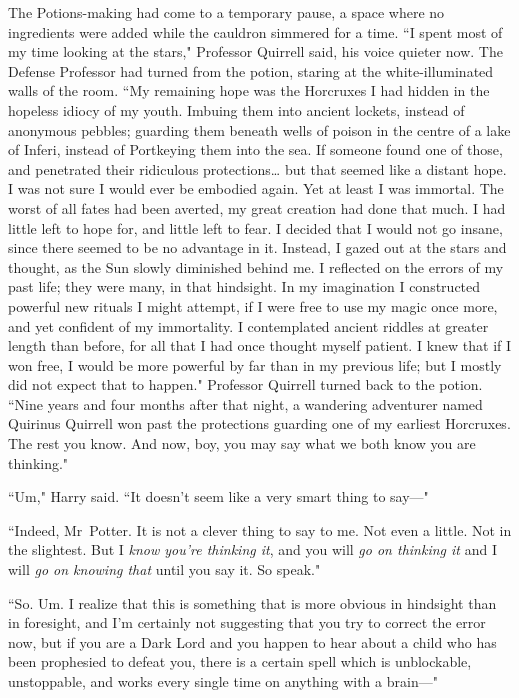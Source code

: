 The Potions-making had come to a temporary pause, a space where no ingredients were added while the cauldron simmered for a time. ``I spent most of my time looking at the stars," Professor Quirrell said, his voice quieter now. The Defense Professor had turned from the potion, staring at the white-illuminated walls of the room. ``My remaining hope was the Horcruxes I had hidden in the hopeless idiocy of my youth. Imbuing them into ancient lockets, instead of anonymous pebbles; guarding them beneath wells of poison in the centre of a lake of Inferi, instead of Portkeying them into the sea. If someone found one of those, and penetrated their ridiculous protections{\ldots} but that seemed like a distant hope. I was not sure I would ever be embodied again. Yet at least I was immortal. The worst of all fates had been averted, my great creation had done that much. I had little left to hope for, and little left to fear. I decided that I would not go insane, since there seemed to be no advantage in it. Instead, I gazed out at the stars and thought, as the Sun slowly diminished behind me. I reflected on the errors of my past life; they were many, in that hindsight. In my imagination I constructed powerful new rituals I might attempt, if I were free to use my magic once more, and yet confident of my immortality. I contemplated ancient riddles at greater length than before, for all that I had once thought myself patient. I knew that if I won free, I would be more powerful by far than in my previous life; but I mostly did not expect that to happen." Professor Quirrell turned back to the potion. ``Nine years and four months after that night, a wandering adventurer named Quirinus Quirrell won past the protections guarding one of my earliest Horcruxes. The rest you know. And now, boy, you may say what we both know you are thinking."

``Um," Harry said. ``It doesn't seem like a very smart thing to say—"

``Indeed, Mr~Potter. It is not a clever thing to say to me. Not even a little. Not in the slightest. But I \emph{know you're thinking it}, and you will \emph{go on thinking it} and I will \emph{go on knowing that} until you say it. So speak."

``So. Um. I realize that this is something that is more obvious in hindsight than in foresight, and I'm certainly not suggesting that you try to correct the error now, but if you are a Dark Lord and you happen to hear about a child who has been prophesied to defeat you, there is a certain spell which is unblockable, unstoppable, and works every single time on anything with a brain—"

